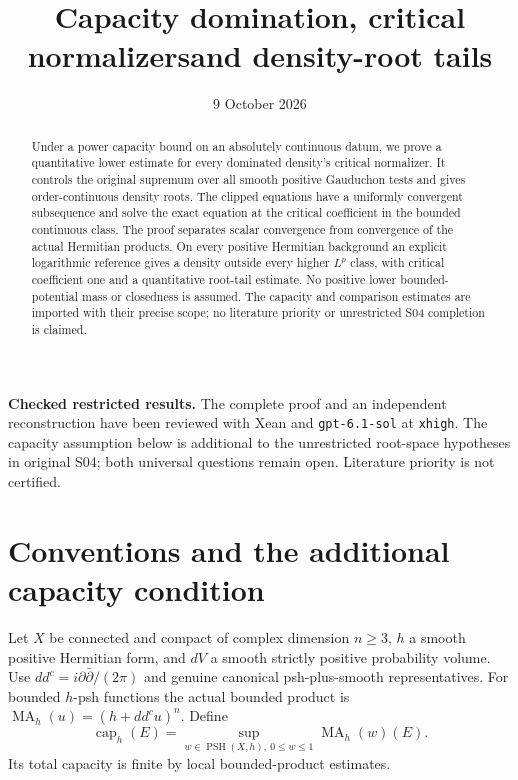 \documentclass[11pt]{article}
\title{Capacity domination, critical normalizers\newline and density-root tails}
\author{}\date{9 October 2026}
\newcommand{\ddc}{dd^c}
\newcommand{\MA}{\operatorname{MA}}
\newcommand{\capH}{\operatorname{cap}}
\newcommand{\PSH}{\operatorname{PSH}}
\theoremstyle{remark}\newtheorem{remark}[theorem]{Remark}
\begin{document}
\maketitle
\noindent\textbf{Checked restricted results.} The complete proof and an
independent reconstruction have been reviewed with Xean and
\texttt{gpt-6.1-sol} at \texttt{xhigh}. The capacity assumption below is
additional to the unrestricted root-space hypotheses in original S04;
both universal questions remain open. Literature priority is not certified.
\begin{abstract}
Under a power capacity bound on an absolutely continuous datum, we prove
a quantitative lower estimate for every dominated density's critical
normalizer. It controls the original supremum over all smooth positive
Gauduchon tests and gives order-continuous density roots. The clipped
equations have a uniformly convergent subsequence and solve the exact
equation at the critical coefficient in the bounded continuous class.
The proof separates scalar convergence from convergence of the actual
Hermitian products. On every positive Hermitian background an explicit
logarithmic reference gives a density outside every higher $L^p$ class,
with critical coefficient one and a quantitative root-tail estimate.
No positive lower bounded-potential mass or closedness is assumed.
The capacity and comparison estimates are imported with their precise
scope; no literature priority or unrestricted S04 completion is claimed.
\end{abstract}

\section{Conventions and the additional capacity condition}
Let $X$ be connected and compact of complex dimension $n\geq3$, $h$ a
smooth positive Hermitian form, and $dV$ a smooth strictly positive
probability volume. Use $\ddc=i\partial\bar\partial/(2\pi)$ and genuine
canonical psh-plus-smooth representatives. For bounded $h$-psh functions
the actual bounded product is $\MA_h(u)=(h+\ddc u)^n$. Define
\[
 \capH_h(E)=\sup_{w\in\PSH(X,h),\ 0\leq w\leq1}\MA_h(w)(E).
\]
Its total capacity is finite by local bounded-product estimates.
\end{document}
